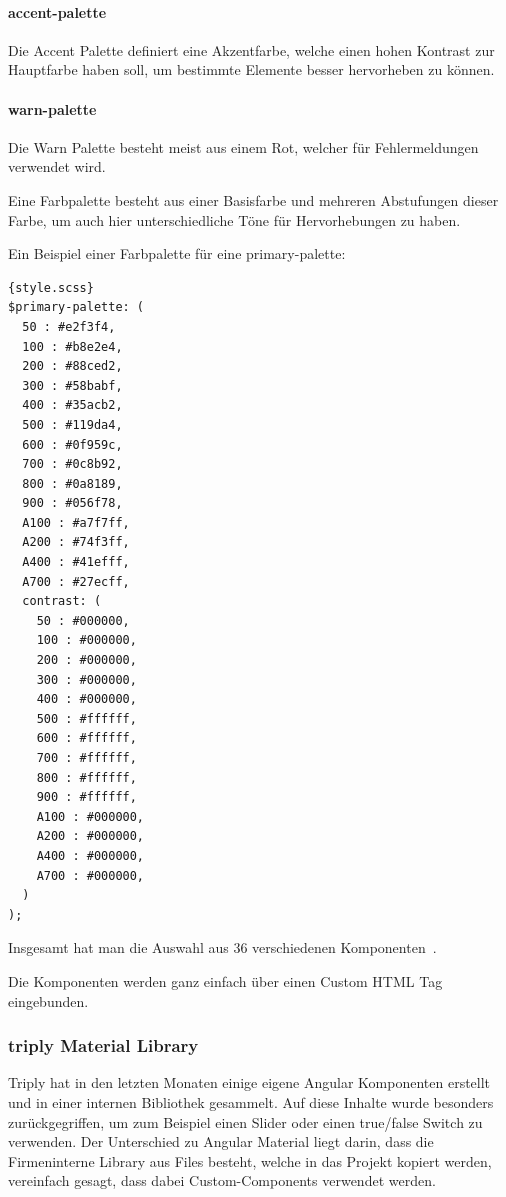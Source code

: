 \paragraph{accent-palette}
Die Accent Palette definiert eine Akzentfarbe, welche einen hohen Kontrast zur Hauptfarbe haben soll, um bestimmte Elemente
besser hervorheben zu können.

\paragraph{warn-palette}
Die Warn Palette besteht meist aus einem Rot, welcher für Fehlermeldungen verwendet wird.

\linebreak
\linebreak
\linebreak

Eine Farbpalette besteht aus einer Basisfarbe und mehreren Abstufungen dieser Farbe, um auch hier unterschiedliche Töne für
Hervorhebungen zu haben.

Ein Beispiel einer Farbpalette für eine primary-palette:

\begin{lstlisting}[label={lst:custom-primary-color-palette}]{style.scss}
$primary-palette: (
  50 : #e2f3f4,
  100 : #b8e2e4,
  200 : #88ced2,
  300 : #58babf,
  400 : #35acb2,
  500 : #119da4,
  600 : #0f959c,
  700 : #0c8b92,
  800 : #0a8189,
  900 : #056f78,
  A100 : #a7f7ff,
  A200 : #74f3ff,
  A400 : #41efff,
  A700 : #27ecff,
  contrast: (
    50 : #000000,
    100 : #000000,
    200 : #000000,
    300 : #000000,
    400 : #000000,
    500 : #ffffff,
    600 : #ffffff,
    700 : #ffffff,
    800 : #ffffff,
    900 : #ffffff,
    A100 : #000000,
    A200 : #000000,
    A400 : #000000,
    A700 : #000000,
  )
);
\end{lstlisting}

Insgesamt hat man die Auswahl aus 36 verschiedenen Komponenten~\cite{angular-material-component-overview,angular-material-description,angular-material-with-angular}.

Die Komponenten werden ganz einfach über einen Custom HTML Tag eingebunden.

\subsubsection{triply Material Library}
Triply hat in den letzten Monaten einige eigene Angular Komponenten erstellt und in einer internen Bibliothek gesammelt.
Auf diese Inhalte wurde besonders zurückgegriffen, um zum Beispiel einen Slider oder einen true/false Switch
zu verwenden.
Der Unterschied zu Angular Material liegt darin, dass die Firmeninterne Library aus Files besteht, welche in das Projekt
kopiert werden, vereinfach gesagt, dass dabei Custom-Components verwendet werden.

